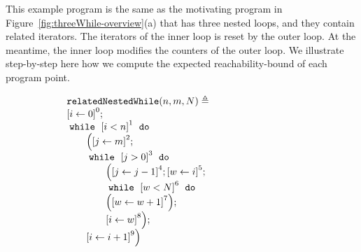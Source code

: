\begin{example}
  \label{ex:threeNestedWhile}
  This example program is the same as the motivating program in Figure~\ref{fig:threeWhile-overview}(a) that has three nested loops, and they contain related iterators.
  The iterators of the inner loop is reset by the outer loop. 
  At the meantime, the inner loop modifies the counters of the outer loop.
  We illustrate step-by-step here how we compute the expected reachability-bound of each program point.
  { \small
\begin{figure}
\centering
\begin{subfigure}{.4\textwidth}
  \begin{centering}
  {\small
  $
  \begin{array}{l}
      \kw{relatedNestedWhile}(n, m, N) \triangleq \\
      \clabel{ \assign{i}{0} }^{0} ; \\
          \ewhile ~ \clabel{i < n}^{1} ~ \edo ~ \\
          \qquad \Big(
           \clabel{\assign{j}{m}}^{2} ;\\
           \qquad \ewhile ~ \clabel{j > 0}^{3} ~ \edo ~ \\
           \qquad \qquad \Big(
            \clabel{\assign{j}{j-1}}^{4};
            \clabel{\assign{w}{i}}^{5};\\
            \qquad \qquad \ewhile ~ \clabel{w < N}^{6} ~ \edo ~
            \\ \qquad \qquad 
            \Big(
              \clabel{\assign{w}{w + 1}}^{7}
                \Big); \\
                \qquad \qquad \clabel{\assign{i}{w}}^{8}
                \Big); \\
                \qquad \clabel{\assign{i}{i+1}}^{9}
            \Big)
      \end{array}
  $
  }
  \caption{}
  \end{centering}
  \end{subfigure}
\begin{subfigure}{.55\textwidth}
  \begin{centering}
\end{centering}
\end{subfigure}
\end{figure}}
\end{example}
